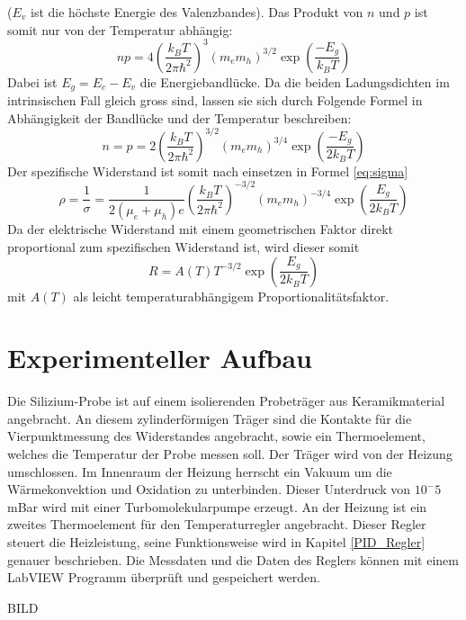 \documentclass[a4paper,parskip,11pt, DIV12]{scrreprt}
\begin{document}
($E_v$ ist die höchste Energie des Valenzbandes). Das Produkt von $n$ und $p$ ist somit nur von der Temperatur abhängig:
\begin{equation}
np = 4 \left(\frac{k_B T}{2 \pi \hbar^2}\right)^{3} (m_e m_h)^{3/2} \exp \left(\frac{-E_g}{k_B T}\right)
\end{equation}
Dabei ist $E_g = E_c - E_v$ die Energiebandlücke. Da die beiden Ladungsdichten im intrinsischen Fall gleich gross sind, lassen sie sich durch Folgende Formel in Abhängigkeit der Bandlücke und der Temperatur beschreiben:
\begin{equation}
n = p = 2 \left(\frac{k_B T}{2 \pi \hbar^2}\right)^{3/2} (m_e m_h)^{3/4} \exp \left(\frac{-E_g}{2 k_B T}\right)
\end{equation}
Der spezifische Widerstand ist somit nach einsetzen in Formel \ref{eq:sigma}
\begin{equation}
\rho = \frac{1}{\sigma} = \frac{1}{2 (\mu_e + \mu_h)e} \left(\frac{k_B T}{2 \pi \hbar^2}\right)^{-3/2} (m_e m_h)^{-3/4} \exp \left(\frac{E_g}{2 k_B T}\right)
\end{equation}
Da der elektrische Widerstand mit einem geometrischen Faktor direkt proportional zum spezifischen Widerstand ist, wird dieser somit
\begin{equation}
\label{eq:Endloesung}
R = A(T) T^{-3/2} \exp \left(\frac{E_g}{2 k_B T}\right)
\end{equation}
mit $A(T)$ als leicht temperaturabhängigem Proportionalitätsfaktor. 

\chapter{Experimenteller Aufbau}
Die Silizium-Probe ist auf einem isolierenden Probeträger aus Keramikmaterial angebracht. An diesem zylinderförmigen Träger sind die Kontakte für die Vierpunktmessung des Widerstandes angebracht, sowie ein Thermoelement, welches die Temperatur der Probe messen soll. Der Träger wird von der Heizung umschlossen. Im Innenraum der Heizung herrscht ein Vakuum um die Wärmekonvektion und Oxidation zu unterbinden. Dieser Unterdruck von $10^-5$ mBar wird mit einer Turbomolekularpumpe erzeugt. An der Heizung ist ein zweites Thermoelement für den Temperaturregler angebracht. Dieser Regler steuert die Heizleistung, seine Funktionsweise wird in Kapitel \ref{PID_Regler}  genauer beschrieben. Die Messdaten und die Daten des Reglers können mit einem LabVIEW Programm überprüft und gespeichert werden.

BILD
\end{document}
